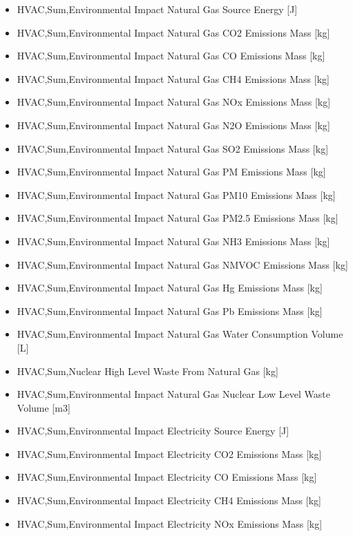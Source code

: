 \begin{itemize}
\item
  HVAC,Sum,Environmental Impact Natural Gas Source Energy {[}J{]}
\item
  HVAC,Sum,Environmental Impact Natural Gas CO2 Emissions Mass {[}kg{]}
\item
  HVAC,Sum,Environmental Impact Natural Gas CO Emissions Mass {[}kg{]}
\item
  HVAC,Sum,Environmental Impact Natural Gas CH4 Emissions Mass {[}kg{]}
\item
  HVAC,Sum,Environmental Impact Natural Gas NOx Emissions Mass {[}kg{]}
\item
  HVAC,Sum,Environmental Impact Natural Gas N2O Emissions Mass {[}kg{]}
\item
  HVAC,Sum,Environmental Impact Natural Gas SO2 Emissions Mass {[}kg{]}
\item
  HVAC,Sum,Environmental Impact Natural Gas PM Emissions Mass {[}kg{]}
\item
  HVAC,Sum,Environmental Impact Natural Gas PM10 Emissions Mass {[}kg{]}
\item
  HVAC,Sum,Environmental Impact Natural Gas PM2.5 Emissions Mass {[}kg{]}
\item
  HVAC,Sum,Environmental Impact Natural Gas NH3 Emissions Mass {[}kg{]}
\item
  HVAC,Sum,Environmental Impact Natural Gas NMVOC Emissions Mass {[}kg{]}
\item
  HVAC,Sum,Environmental Impact Natural Gas Hg Emissions Mass {[}kg{]}
\item
  HVAC,Sum,Environmental Impact Natural Gas Pb Emissions Mass {[}kg{]}
\item
  HVAC,Sum,Environmental Impact Natural Gas Water Consumption Volume {[}L{]}
\item
  HVAC,Sum,Nuclear High Level Waste From Natural Gas {[}kg{]}
\item
  HVAC,Sum,Environmental Impact Natural Gas Nuclear Low Level Waste Volume {[}m3{]}
\item
  HVAC,Sum,Environmental Impact Electricity Source Energy {[}J{]}
\item
  HVAC,Sum,Environmental Impact Electricity CO2 Emissions Mass {[}kg{]}
\item
  HVAC,Sum,Environmental Impact Electricity CO Emissions Mass {[}kg{]}
\item
  HVAC,Sum,Environmental Impact Electricity CH4 Emissions Mass {[}kg{]}
\item
  HVAC,Sum,Environmental Impact Electricity NOx Emissions Mass {[}kg{]}

\end{itemize}
